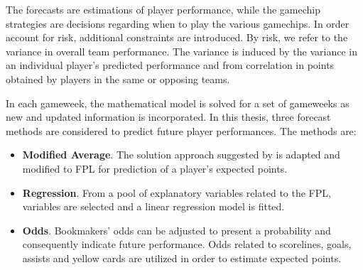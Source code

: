 The forecasts are estimations of player performance, while the gamechip strategies are decisions regarding when to play the various gamechips. In order account for risk, additional constraints are introduced. By risk, we refer to the variance in overall team performance. The variance is induced by the variance in an individual player's predicted performance and from correlation in points obtained by players in the same or opposing teams.

\newpar

In each gameweek, the mathematical model is solved for a set of gameweeks as new and updated information is incorporated. In this thesis, three forecast methods are considered to predict future player performances. The methods are: 
\begin{itemize}
    \item \textbf{Modified Average}. The solution approach suggested by \cite{Bonomo} is adapted and modified to FPL for prediction of a player's expected points.
    \item \textbf{Regression}. From a pool of explanatory variables related to the FPL, variables are selected and a linear regression model is fitted. 
    \item \textbf{Odds}. Bookmakers' odds can be adjusted to present a probability and consequently indicate future performance. Odds related to scorelines, goals, assists and yellow cards are utilized in order to estimate expected points. 
\end{itemize}

